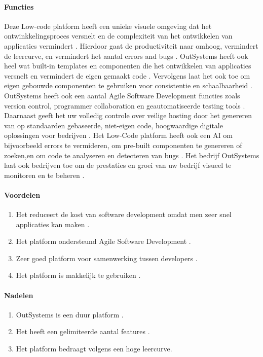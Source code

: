 \paragraph{Functies}
Deze Low-code platform heeft een unieke visuele omgeving dat het ontwinkkelingsproces versnelt en de complexiteit van het ontwikkelen van applicaties vermindert \autocite{Payne2023}.
Hierdoor gaat de productiviteit naar omhoog, vermindert de leercurve, en vermindert het aantal errors and bugs \autocite{Payne2023}. OutSystems heeft ook heel wat built-in templates 
en componenten die het ontwikkelen van applicaties versnelt en vermindert de eigen gemaakt code \autocite{Payne2023}.
Vervolgens laat het ook toe om eigen gebouwde componenten te gebruiken voor consistentie en schaalbaarheid \autocite{Ranosys2023}.
OutSystems heeft ook een aantal Agile Software Development functies zoals version control, programmer collaboration en geautomatiseerde testing tools \autocite{Ranosys2023}.
Daarnaast geeft het uw volledig controle over veilige hosting door het genereren van op standaarden gebaseerde, niet-eigen code, hoogwaardige digitale oplossingen voor bedrijven \autocite{Ranosys2023}.
Het Low-Code platform heeft ook een AI om bijvoorbeeld errors te vermideren, om pre-built componenten te genereren of zoeken,en om code te analyseren en detecteren van bugs \autocite{Ranosys2023}.
Het bedrijf OutSystems laat ook bedrijven toe om de prestaties en groei van uw bedrijf visueel te monitoren en te beheren \autocite{Ranosys2023}.

\paragraph*{Voordelen}
\begin{enumerate}
    \item Het reduceert de kost van software development omdat men zeer snel applicaties kan maken \autocite{Payne2023}.
    \item Het platform ondersteund Agile Software Development \autocite{Payne2023}.
    \item Zeer goed platform voor samenwerking tussen developers \autocite{Payne2023}.
    \item Het platform is makkelijk te gebruiken \autocite{G22024OutSystems}.
\end{enumerate}


\paragraph*{Nadelen}
\begin{enumerate}
    \item OutSystems is een duur platform \autocite{G22024OutSystems}.
    \item Het heeft een gelimiteerde aantal features \autocite{G22024OutSystems}.
    \item Het platform bedraagt volgens \textcite{G22024OutSystems} een hoge leercurve.
\end{enumerate}

